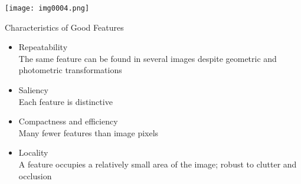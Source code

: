 \begin{frame}
    \centering
    \texttt{[image: img0004.png]}
\end{frame}


\begin{frame}{Characteristics of Good Features}
    \begin{itemize}
        \item \alert{Repeatability}\\The same feature can be found in several images despite geometric and photometric transformations
        \item \alert{Saliency}\\Each feature is distinctive
        \item \alert{Compactness and efficiency}\\Many fewer features than image pixels
        \item \alert{Locality}\\A feature occupies a relatively small area of the image; robust to clutter and occlusion
    \end{itemize}
\end{frame}



